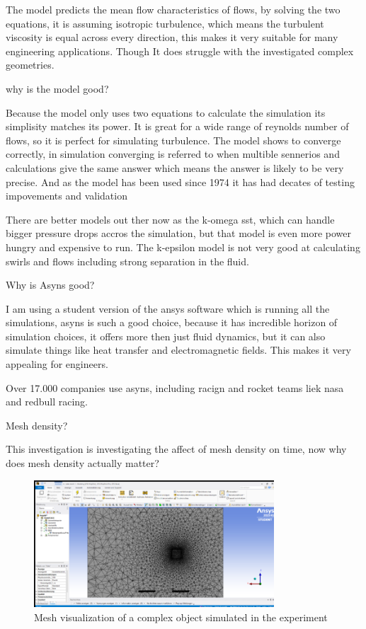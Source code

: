 \documentclass[12pt,a4paper]{article}
\begin{document}
The model predicts the mean flow characteristics of flows, by solving the two equations, it is assuming isotropic turbulence, which means the turbulent viscosity is equal across every direction, this makes it very suitable for many engineering applications. Though It does struggle with the investigated complex geometries.

why is the model good?

Because the model only uses two equations to calculate the simulation its simplisity matches its power. It is great for a wide range of reynolds number of flows, so it is perfect for simulating turbulence. The model shows to converge correctly, in simulation converging is referred to when multible sennerios and calculations give the same answer which means the answer is likely to be very precise. And as the model has been used since 1974 it has had decates of testing impovements and validation

There are better models out ther now as the k-omega sst, which can handle bigger pressure drops accros the simulation, but that model is even more power hungry and expensive to run. The k-epsilon model is not very good at calculating swirls and flows including strong separation in the fluid.

Why is Asyns good?

I am using a student version of the ansys software which is running all the simulations, asyns is such a good choice, because it has incredible horizon of simulation choices, it offers more then just fluid dynamics, but it can also simulate things like heat transfer and electromagnetic fields. This makes it very appealing for engineers. 

Over 17.000 companies use asyns, including racign and rocket teams liek nasa and redbull racing.

Mesh density?

This investigation is investigating the affect of mesh density on time, now why does mesh density actually matter?

\begin{figure}[H]
\centering
\includegraphics[width=0.8\textwidth]{image9.png}
\caption{Mesh visualization of a complex object simulated in the experiment}
\end{figure}
\end{document}
